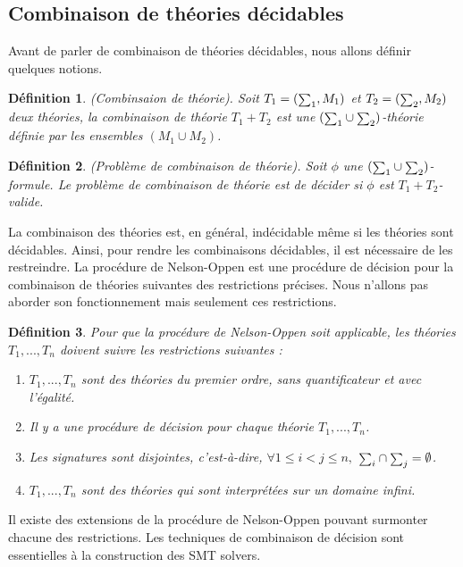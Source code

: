 \documentclass[11pt,openany]{article}
\newcommand\smallsum{\mathsmaller\sum}
\newtheorem{definition}{D\'efinition}[subsection]
\begin{document}
	
 	\subsection{Combinaison de th\'eories d\'ecidables}
 	Avant de parler de combinaison de th\'eories d\'ecidables, nous allons d\'efinir quelques notions.
 	\begin{definition}
 	(Combinsaion de th\'eorie).
 		Soit $T_{1}=(\smallsum_{1},M_{1})$ et $T_{2}=(\smallsum_{2},M_{2})$ deux th\'eories, la combinaison de th\'eorie $T_{1} + T_{2}$ est une $(\smallsum_{1}\cup\smallsum_{2})$-th\'eorie d\'efinie par les ensembles $(M_{1}\cup M_{2})$.
	\end{definition}
	
	\begin{definition}
	(Probl\`eme de combinaison de th\'eorie). Soit $\phi$ une $(\smallsum_{1}\cup\smallsum_{2})$-formule. Le probl\`eme de combinaison de th\'eorie est de d\'ecider si $\phi$ est $T_{1}+T_{2}$-valide.
	\end{definition}\par
	La combinaison des th\'eories est, en g\'en\'eral, ind\'ecidable m\^eme si les th\'eories sont d\'ecidables. Ainsi, pour rendre les combinaisons d\'ecidables, il est n\'ecessaire de les restreindre.	La proc\'edure de Nelson-Oppen est une proc\'edure de d\'ecision pour la combinaison de th\'eories suivantes des restrictions pr\'ecises. Nous n'allons pas aborder son fonctionnement mais seulement ces restrictions.
	\begin{definition}
		Pour que la proc\'edure de Nelson-Oppen soit applicable, les th\'eories $T_{1},...,T_{n}$ doivent suivre les restrictions suivantes :
		\begin{enumerate}
		\item $T_{1},...,T_{n}$ sont des th\'eories du premier ordre, sans quantificateur et avec l'\'egalit\'e.
		\item Il y a une proc\'edure de d\'ecision pour chaque th\'eorie $T_{1},...,T_{n}$.
		\item Les signatures sont disjointes, c'est-\`a-dire, $\forall 1\leq i<j\leq n,$ $\smallsum_{i}\cap\smallsum_{j}=\emptyset$.
		\item $T_{1},...,T_{n}$ sont des th\'eories qui sont interpr\'et\'ees sur un domaine infini.
		\end{enumerate}
	\end{definition}
	Il existe des extensions de la proc\'edure de Nelson-Oppen pouvant surmonter chacune des restrictions. Les techniques de combinaison de d\'ecision sont essentielles \`a la construction des SMT solvers.
\end{document}

